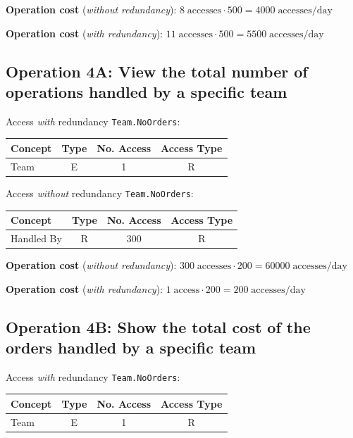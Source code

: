     \textbf{Operation cost} (\textit{without redundancy}): $8 \; \text{accesses} \cdot 500 = 4000 \; \text{accesses/day}$ 

    \textbf{Operation cost} (\textit{with redundancy}): $11 \; \text{accesses} \cdot 500 = 5500 \; \text{accesses/day}$
    
    \subsection*{Operation 4A: View the total number of operations handled by a specific team}
    
    Access \textit{with} redundancy \texttt{Team.NoOrders}:
    
    \begin{table}[h!]
    \centering
    \begin{tabular}{|l|c|c|c|}
    \hline
    \textbf{Concept} & \textbf{Type} & \textbf{No. Access} & \textbf{Access Type} \\
    \hline
    Team    & E & 1 & R \\
    \hline
    \end{tabular}
    \end{table}
    
    Access \textit{without} redundancy \texttt{Team.NoOrders}:
    
    \begin{table}[h!]
    \centering
    \begin{tabular}{|l|c|c|c|}
    \hline
    \textbf{Concept}    & \textbf{Type} & \textbf{No. Access} & \textbf{Access Type} \\
    \hline
    Handled By & R & 300 & R \\
    \hline
    \end{tabular}
    \end{table}
    
    \textbf{Operation cost} (\textit{without redundancy}): $300 \; \text{accesses} \cdot 200 = 60000 \; \text{accesses/day}$

    \textbf{Operation cost} (\textit{with redundancy}): $1 \; \text{access} \cdot 200 = 200 \; \text{accesses/day}$  

    \subsection*{Operation 4B: Show the total cost of the orders handled by a specific team}
    Access \textit{with} redundancy \texttt{Team.NoOrders}:
    
    \begin{table}[H]
        \centering
        \begin{tabular}{|l|c|c|c|}
        \hline
        \textbf{Concept} & \textbf{Type} & \textbf{No. Access} & \textbf{Access Type} \\
        \hline
        Team    & E & 1 & R \\
        \hline
        \end{tabular}
        \end{table}
    
